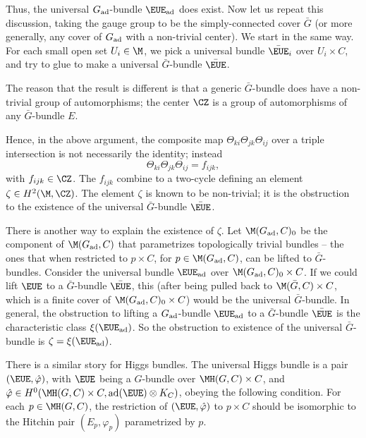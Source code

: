 Thus, the universal   $G_{{\rm ad}}$-bundle ${\EUE}_{\rm {ad}}$
does exist. Now let us repeat this discussion, taking the gauge
group to be the simply-connected cover $\bar G$ (or more
generally, any cover of $G_{\rm{ad}}$ with a non-trivial center).
We start in the same way. For each small open set $U_i\in \M$, we
pick a universal bundle $\bar {\EUE}_i$ over $U_i\times C$, and
try to glue to make a universal $\bar G$-bundle $\bar {\EUE}$.

The reason that the result is different is that a generic $\bar
G$-bundle does have a non-trivial group of automorphisms; the
center $\CZ$ is a group of automorphisms of any $\bar G$-bundle
$E$.

Hence, in the above argument, the composite map
$\Theta_{ki}\Theta_{jk}\Theta_{ij}$ over a triple intersection is
not necessarily the identity; instead %
\setcounter{equation}{11}
\begin{equation}\label{eq:yrf}
\Theta_{ki}\Theta_{jk}\Theta_{ij}=f_{ijk},
\end{equation}
 with
$f_{ijk}\in\CZ$. The $f_{ijk}$ combine to a two-cycle defining an
element $\zeta\in H^2(\M,\CZ)$. The element $\zeta$ is known to be
non-trivial; it is the obstruction to the existence of the
universal $\bar G$-bundle $\bar{\EUE}$.

There is another way to explain the existence of $\zeta$.  Let
$\M(G_{\rm{ad}},C)_0$
  be the component of $\M(G_{\rm{ad}},C)$ that
parametrizes topologically trivial bundles -- the ones that when
restricted to $p\times C$, for $p\in \M(G_{\rm{ad}},C)$, can be
lifted to $\bar G$-bundles.    Consider the universal bundle
${\EUE}_{\rm{ad}}$ over   $\M(G_{\rm{ad}},C)_0\times C$.  If we
could lift ${\EUE}$ to a $\bar G$-bundle $\bar {\EUE}$, this
(after being pulled back to $\M(\bar G,C)\times C$, which is a
finite cover of $\M(G_{\rm {ad}},C)_0\times C$) would be the
universal $\bar G$-bundle. In general, the obstruction to lifting
a $G_{\rm ad}$-bundle ${\EUE}_{\rm{ad}}$ to a $\bar G$-bundle
$\bar {\EUE}$ is the characteristic class $\xi({\EUE}_{\rm{ad}})$.
So the obstruction to existence of the universal $\bar G$-bundle
is $\zeta=\xi({\EUE}_{\rm {ad}})$.

There is a similar story for Higgs bundles.  The universal Higgs
bundle is a pair $( {\EUE},\hat \varphi)$,
 with $ {\EUE} $ being a $G$-bundle over
$ \MH(G,C)\times C$, and $\hat\varphi\in H^0( \MH(G,C)\times
C,{\rm {ad}}({\EUE})\otimes K_C)$, obeying the following
condition. For each $p\in \MH(G,C)$, the restriction of $(
{\EUE},\hat\varphi)$ to $p\times C$ should be isomorphic to the
Hitchin pair $(E_p,\varphi_p)$ parametrized by $p$.

